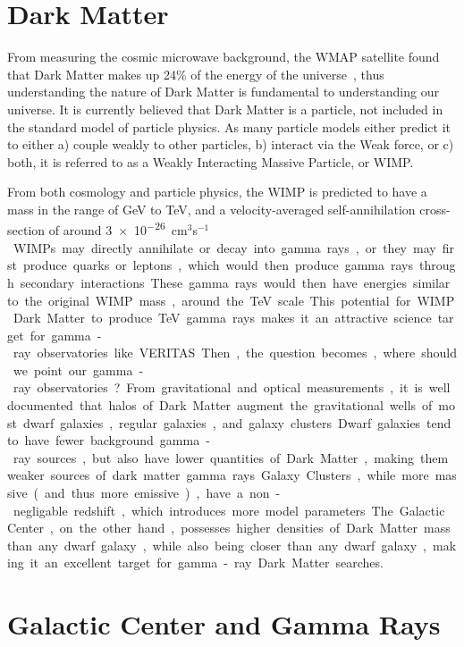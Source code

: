 \section{Dark Matter}

  From measuring the cosmic microwave background, the WMAP satellite found that Dark Matter makes up 24\% of the energy of the universe~\cite{pdg_2012}, thus understanding the nature of Dark Matter is fundamental to understanding our universe.
  It is currently believed that Dark Matter is a particle, not included in the standard model of particle physics.
  As many particle models either predict it to either a) couple weakly to other particles, b) interact via the Weak force, or c) both, it is referred to as a Weakly Interacting Massive Particle, or WIMP.

  From both cosmology and particle physics, the WIMP is predicted to have a mass in the range of GeV to TeV, and a velocity-averaged self-annihilation cross-section of around \nicetilde{}\SI{3e-26}{cm${}^3$s${}^{-1}$}.
  WIMPs may directly annihilate or decay into gamma rays, or they may first produce quarks or leptons, which would then produce gamma rays through secondary interactions.
  These gamma rays would then have energies similar to the original WIMP mass, around the TeV scale.
  This potential for WIMP Dark Matter to produce TeV gamma rays makes it an attractive science target for gamma-ray observatories like VERITAS.

  Then, the question becomes, where should we point our gamma-ray observatories?
  From gravitational and optical measurements, it is well documented that halos of Dark Matter augment the gravitational wells of most dwarf galaxies, regular galaxies, and galaxy clusters.
  Dwarf galaxies tend to have fewer background gamma-ray sources, but also have lower quantities of Dark Matter, making them weaker sources of dark matter gamma rays.
  Galaxy Clusters, while more massive (and thus more emissive), have a non-negligable redshift, which introduces more model parameters.
  The Galactic Center, on the other hand, possesses higher densities of Dark Matter mass than any dwarf galaxy, while also being closer than any dwarf galaxy, making it an excellent target for gamma-ray Dark Matter searches.


\section{Galactic Center and Gamma Rays}

